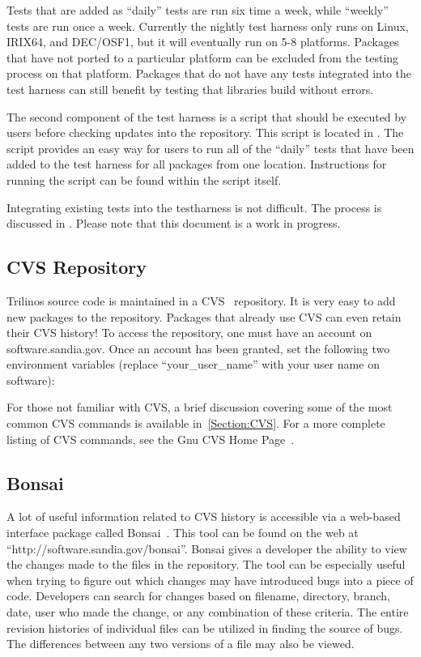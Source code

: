 \documentclass[12pt,relax]{TrilinosDevGuide}
\begin{document}
Tests that are added as ``daily'' tests are run six time a week, while 
``weekly'' tests are run once a week.  Currently the nightly test harness only 
runs on Linux, IRIX64, and DEC/OSF1, but it will eventually run on 5-8 
platforms.  Packages that have not ported to a particular platform can be 
excluded from the testing process on that platform.  Packages that do not have 
any tests integrated into the test harness can still benefit by testing that 
libraries build without errors.  

The second component of the test harness is a script that should be executed 
by users before checking updates into the repository.  This script is located 
in .  The script 
provides an easy way for users to run all of the ``daily'' tests that have 
been added to the test harness for all packages from one location.  
Instructions for running the script can be found within the script itself.

Integrating existing tests into the testharness is not difficult.  
The process is discussed in 
.  
Please note that this document is a work in progress.

\subsection{CVS Repository}

Trilinos source code is maintained in a CVS~\cite{CVS} repository.  It is 
very easy to add new packages to the repository.  Packages that already use 
CVS can even retain their CVS history!  To access the repository, one must 
have an account on software.sandia.gov.  Once an account has been granted, 
set the following two environment variables (replace ``your\_user\_name'' 
with your user name on software):


For those not familiar with CVS, a brief discussion covering some of the most 
common CVS commands is available in~\ref{Section:CVS}.  For a more complete 
listing of CVS commands, see the Gnu CVS Home Page~\cite{CVS}.

\subsection{Bonsai}
A lot of useful information related to CVS history is accessible via a
web-based interface package called Bonsai~\cite{Bonsai}.  This tool can be 
found on the web at ``http://software.sandia.gov/bonsai''.  Bonsai gives a 
developer the ability to view the changes made to the files in the 
repository.  The tool can be especially useful when trying to figure out which 
changes may have introduced bugs into a piece of code.  Developers can search 
for changes based on filename, directory, branch, date, user who made the 
change, or any combination of these criteria.  The entire revision histories of
individual files can be utilized in finding the source of 
bugs.  The differences between any two versions of a file may also be viewed.  
\end{document}
